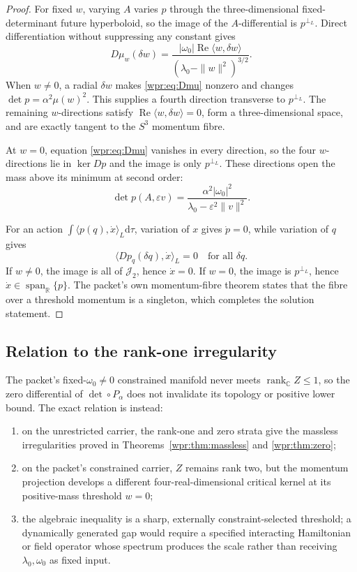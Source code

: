 \documentclass[11pt]{article}
\newcommand{\J}{\mathcal J_2}
\newcommand{\rankC}{\operatorname{rank}_{\mathbb C}}
\newcommand{\dd}{\mathrm d}
\newcommand{\SpanR}{\operatorname{span}_{\mathbb R}}
\begin{document}
\begin{proof}
For fixed \(w\), varying \(A\) varies \(p\) through the
three-dimensional fixed-determinant future hyperboloid, so the image
of the \(A\)-differential is \(p^{\perp_L}\).  Direct differentiation
without suppressing any constant gives
\begin{equation}
 D\mu_w(\delta w)
 =
 \frac{|\omega_0|\operatorname{Re}\langle w,\delta w\rangle}
 {(\lambda_0-\|w\|^2)^{3/2}}.
 \label{wpr:eq:Dmu}
\end{equation}
When \(w\neq0\), a radial \(\delta w\) makes
\eqref{wpr:eq:Dmu} nonzero and changes \(\det p=\alpha^2\mu(w)^2\).
This supplies a fourth direction transverse to \(p^{\perp_L}\).
The remaining \(w\)-directions satisfy
\(\operatorname{Re}\langle w,\delta w\rangle=0\), form a
three-dimensional space, and are exactly tangent to the \(S^3\)
momentum fibre.

At \(w=0\), equation \eqref{wpr:eq:Dmu} vanishes in every direction,
so the four \(w\)-directions lie in \(\ker Dp\) and the image is only
\(p^{\perp_L}\).  These directions open the mass above its minimum at
second order:
\[
 \det p(A,\varepsilon v)
 =
 \frac{\alpha^2|\omega_0|^2}
 {\lambda_0-\varepsilon^2\|v\|^2}.
\]

For an action \(\int\langle p(q),\dot x\rangle_L\dd\tau\), variation
of \(x\) gives \(\dot p=0\), while variation of \(q\) gives
\[
 \langle Dp_q(\delta q),\dot x\rangle_L=0
 \quad\text{for all }\delta q.
\]
If \(w\neq0\), the image is all of \(\J\), hence \(\dot x=0\).
If \(w=0\), the image is \(p^{\perp_L}\), hence
\(\dot x\in\SpanR\{p\}\).  The packet's own momentum-fibre theorem
states that the fibre over a threshold momentum is a singleton, which
completes the solution statement.
\end{proof}

\subsection{Relation to the rank-one irregularity}

The packet's fixed-\(\omega_0\neq0\) constrained manifold never meets
\(\rankC Z\leq1\), so the zero differential of
\(\det\circ P_\alpha\) does not invalidate its topology or positive
lower bound.  The exact relation is instead:
\begin{enumerate}
\item on the unrestricted carrier, the rank-one and zero strata give
the massless irregularities proved in
Theorems~\ref{wpr:thm:massless} and \ref{wpr:thm:zero};
\item on the packet's constrained carrier, \(Z\) remains rank two, but
the momentum projection develops a different four-real-dimensional
critical kernel at its positive-mass threshold \(w=0\);
\item the algebraic inequality is a sharp, externally
constraint-selected threshold; a dynamically generated gap would
require a specified interacting Hamiltonian or field operator whose
spectrum produces the scale rather than receiving
\(\lambda_0,\omega_0\) as fixed input.
\end{enumerate}
\end{document}

